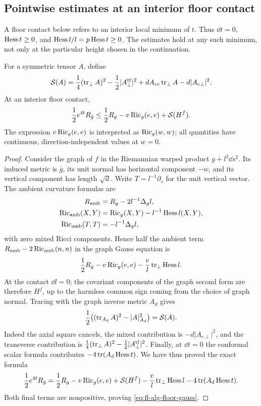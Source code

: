 \subsection{Pointwise estimates at an interior floor contact}
\label{sec:fl-alg-floor}

A floor contact below refers to an interior local minimum of \(t\).
Thus \(\dd t=0\), \(\operatorname{Hess} t\ge0\), and
\(\operatorname{Hess} l/l=p\operatorname{Hess} t\ge0\).
The estimates hold at any such minimum, not only at the particular
height chosen in the continuation.

\begin{lemma}
\label{lem:fl-alg-floor-gauss}
For a symmetric tensor \(A\), define
\[
 \mathcal S(A)
 =\frac14(\operatorname{tr}_\perp A)^2-\frac12|A_\perp^{\mathrm{tf}}|^2
       +dA_{ee}\operatorname{tr}_\perp A-d|A_{e\perp}|^2.
\]
At an interior floor contact,
\begin{equation}
 \frac12e^{4t}R_{\hat g}
 \le \frac12R_g-v\operatorname{Ric}_g(e,e)+\mathcal S(H^f).
 \label{eq:fl-alg-floor-gauss}
\end{equation}
The expression \(v\operatorname{Ric}_g(e,e)\) is interpreted as \(\operatorname{Ric}_g(w,w)\);
all quantities have continuous, direction-independent values at
\(w=0\).
\end{lemma}

\begin{proof}
Consider the graph of \(f\) in the Riemannian warped product
\(g+l^2\dd s^2\). Its induced metric is \(\bar g\), its unit normal
has horizontal component \(-w\), and its vertical component has
length \(\sqrt d\).
Write \(T=l^{-1}\partial_s\) for the unit vertical vector.
The ambient curvature formulas are
\begin{align*}
 R_{\mathrm{amb}}&=R_g-2l^{-1}\Delta_gl,\\
 \operatorname{Ric}_{\mathrm{amb}}(X,Y)&=\operatorname{Ric}_g(X,Y)-l^{-1}\operatorname{Hess} l(X,Y),\\
 \operatorname{Ric}_{\mathrm{amb}}(T,T)&=-l^{-1}\Delta_gl,
\end{align*}
with zero mixed Ricci components.
Hence half the ambient term
\(R_{\mathrm{amb}}-2\operatorname{Ric}_{\mathrm{amb}}(n,n)\) in the graph Gauss
equation is
\[
 \frac12R_g-v\operatorname{Ric}_g(e,e)
                         -\frac vl\operatorname{tr}_\perp\operatorname{Hess} l.
\]
At the contact \(\dd l=0\); the covariant components of the graph
second form are therefore \(H^f\), up to the harmless common sign
coming from the choice of graph normal.
Tracing with the graph inverse metric \(A_d\) gives
\[
 \frac12\bigl((\operatorname{tr}_{A_d}A)^2-|A|_{A_d}^2\bigr)=\mathcal S(A).
\]
Indeed the axial square cancels, the mixed contribution is
\(-d|A_{e\perp}|^2\), and the transverse contribution is
\(\frac14(\operatorname{tr}_\perp A)^2-\frac12|A_\perp^{\mathrm{tf}}|^2\).
Finally, at \(\dd t=0\) the conformal scalar formula contributes
\(-4\operatorname{tr}(A_d\operatorname{Hess} t)\). We have thus proved the exact formula
\[
 \frac12e^{4t}R_{\hat g}
 =\frac12R_g-v\operatorname{Ric}_g(e,e)+\mathcal S(H^f)
       -\frac vl\operatorname{tr}_\perp\operatorname{Hess} l-4\operatorname{tr}(A_d\operatorname{Hess} t).
\]
Both final terms are nonpositive, proving
\eqref{eq:fl-alg-floor-gauss}.
\end{proof}

